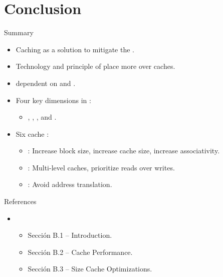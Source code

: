 \section{Conclusion}

\begin{frame}[t]{Summary}
\begin{itemize}

  \item Caching as a solution to mitigate the .

  \item Technology  and principle of 
        place more  over caches.
  
  \item {} dependent on 
        and .

  \item Four key dimensions in :
    \begin{itemize}
      \item 
        , 
        ,
        , and
        .
    \end{itemize}

  \item Six  cache :
    \begin{itemize}
      \item {}: 
        Increase block size,
        increase cache size,
        increase associativity.
      \item {}:
        Multi-level caches, 
        prioritize reads over writes.
      \item {}:
        Avoid address translation.
    \end{itemize}
\end{itemize}
\end{frame}


\begin{frame}[t]{References}
\begin{itemize}
  \item \bibhennessy
    \begin{itemize}
       \item Sección B.1 -- Introduction.
       \item Sección B.2 -- Cache Performance.
       \item Sección B.3 -- Size Cache Optimizations.
    \end{itemize}
\end{itemize}
\end{frame}
